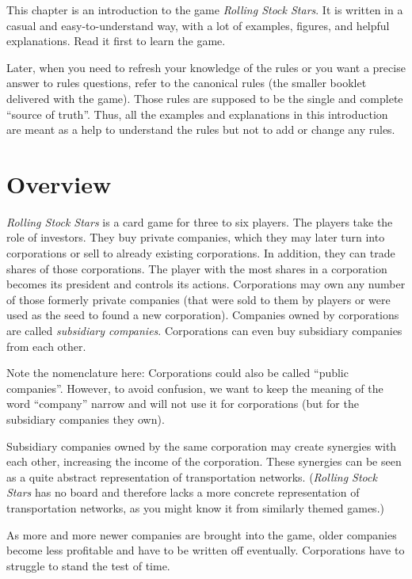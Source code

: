 \documentclass[10pt,final]{report}
\begin{document}
\begin{multicols}{2}

  This chapter is an introduction to the game \emph{Rolling Stock
    Stars}. It is written in a casual and easy-to-understand way, with
  a lot of examples, figures, and helpful explanations. Read it first
  to learn the game.

  Later, when you need to refresh your knowledge of the rules or you
  want a precise answer to rules questions, refer to the canonical
  rules (the smaller booklet delivered with the game). Those rules
  are supposed to be the single and complete ``source of
  truth''. Thus, all the examples and explanations in this
  introduction are meant as a help to understand the rules but not to
  add or change any rules.

\section{Overview}

\emph{Rolling Stock Stars} is a card game for three to six
players. The players take the role of investors. They buy private
companies, which they may later turn into corporations or sell to
already existing corporations. In addition, they can trade shares of
those corporations. The player with the most shares in a corporation
becomes its president and controls its actions. Corporations may own
any number of those formerly private companies (that were sold to them
by players or were used as the seed to found a new
corporation). Companies owned by corporations are called
\emph{subsidiary companies}. Corporations can even buy subsidiary
companies from each other.

Note the nomenclature here: Corporations could also be called ``public
companies''. However, to avoid confusion, we want to keep the meaning
of the word ``company'' narrow and will not use it for corporations
(but for the subsidiary companies they own).

Subsidiary companies owned by the same corporation may create
synergies with each other, increasing the income of the
corporation. These synergies can be seen as a quite abstract
representation of transportation networks. (\emph{Rolling Stock Stars}
has no board and therefore lacks a more concrete representation of
transportation networks, as you might know it from similarly themed
games.)

As more and more newer companies are brought into the game,
older companies become less profitable and have to be written off
eventually. Corporations have to struggle to stand the test of time.


\end{multicols}
\end{document}
